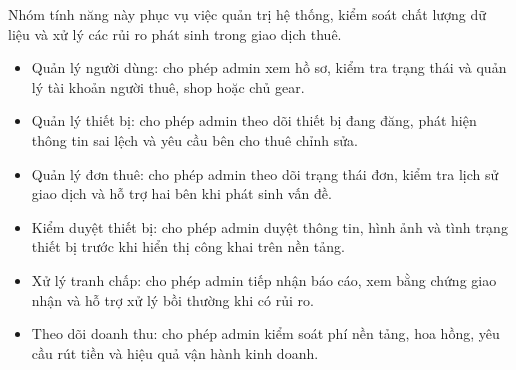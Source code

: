 Nhóm tính năng này phục vụ việc quản trị hệ thống, kiểm soát chất lượng dữ liệu và xử lý các rủi ro phát sinh trong giao dịch thuê.

\begin{itemize}
    \item Quản lý người dùng: cho phép admin xem hồ sơ, kiểm tra trạng thái và quản lý tài khoản người thuê, shop hoặc chủ gear.
    \item Quản lý thiết bị: cho phép admin theo dõi thiết bị đang đăng, phát hiện thông tin sai lệch và yêu cầu bên cho thuê chỉnh sửa.
    \item Quản lý đơn thuê: cho phép admin theo dõi trạng thái đơn, kiểm tra lịch sử giao dịch và hỗ trợ hai bên khi phát sinh vấn đề.
    \item Kiểm duyệt thiết bị: cho phép admin duyệt thông tin, hình ảnh và tình trạng thiết bị trước khi hiển thị công khai trên nền tảng.
    \item Xử lý tranh chấp: cho phép admin tiếp nhận báo cáo, xem bằng chứng giao nhận và hỗ trợ xử lý bồi thường khi có rủi ro.
    \item Theo dõi doanh thu: cho phép admin kiểm soát phí nền tảng, hoa hồng, yêu cầu rút tiền và hiệu quả vận hành kinh doanh.
\end{itemize}
